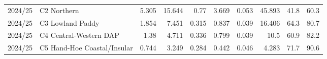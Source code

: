 \begin{tabular}{llrrrrrrrr}
 2024/25 & C2 Northern                 &              5.305 & 15.644 &    0.77  & 3.669 &          0.053 &         45.893 &                      41.8 &                      60.3 \\
 2024/25 & C3 Lowland Paddy            &              1.854 &  7.451 &    0.315 & 0.837 &          0.039 &         16.406 &                      64.3 &                      80.7 \\
 2024/25 & C4 Central-Western DAP      &              1.38  &  4.711 &    0.336 & 0.799 &          0.039 &         10.5   &                      60.9 &                      82.2 \\
 2024/25 & C5 Hand-Hoe Coastal/Insular &              0.744 &  3.249 &    0.284 & 0.442 &          0.046 &          4.283 &                      71.7 &                      90.6 \\
\bottomrule
\end{tabular}